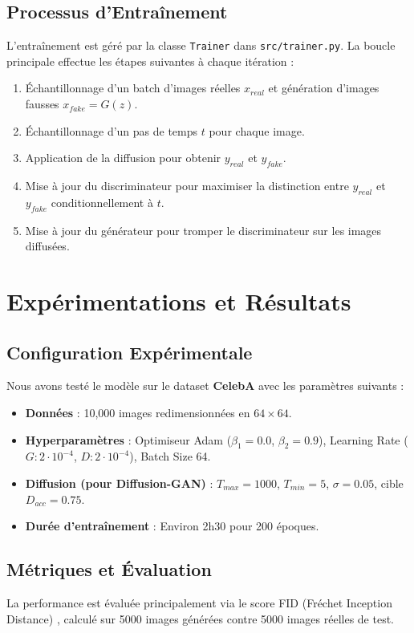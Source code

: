 \documentclass[a4paper,11pt]{article}
\begin{document}
\subsection{Processus d'Entraînement}
L'entraînement est géré par la classe \texttt{Trainer} dans \texttt{src/trainer.py}. La boucle principale effectue les étapes suivantes à chaque itération :
\begin{enumerate}
    \item Échantillonnage d'un batch d'images réelles $x_{real}$ et génération d'images fausses $x_{fake} = G(z)$.
    \item Échantillonnage d'un pas de temps $t$ pour chaque image.
    \item Application de la diffusion pour obtenir $y_{real}$ et $y_{fake}$.
    \item Mise à jour du discriminateur pour maximiser la distinction entre $y_{real}$ et $y_{fake}$ conditionnellement à $t$.
    \item Mise à jour du générateur pour tromper le discriminateur sur les images diffusées.
\end{enumerate}

\section{Expérimentations et Résultats}

\subsection{Configuration Expérimentale}
Nous avons testé le modèle sur le dataset \textbf{CelebA} avec les paramètres suivants :
\begin{itemize}
    \item \textbf{Données} : 10,000 images redimensionnées en $64\times64$.
    \item \textbf{Hyperparamètres} : Optimiseur Adam ($\beta_1=0.0$, $\beta_2=0.9$), Learning Rate ($G: 2\cdot10^{-4}$, $D: 2\cdot10^{-4}$), Batch Size 64.
    \item \textbf{Diffusion (pour Diffusion-GAN)} : $T_{max}=1000$, $T_{min}=5$, $\sigma=0.05$, cible $D_{acc}=0.75$.
    \item \textbf{Durée d'entraînement} : Environ 2h30 pour 200 époques.
\end{itemize}

\subsection{Métriques et Évaluation}
La performance est évaluée principalement via le score FID (Fréchet Inception Distance) \cite{heusel2017fid}, calculé sur 5000 images générées contre 5000 images réelles de test.
\end{document}
